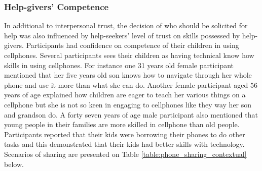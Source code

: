 \subsubsection*{Help-givers' Competence}
In additional to interpersonal trust, the decision of who should be solicited for help was also influenced by help-seekers' level of trust on skills possessed by help-givers. Participants had confidence on competence of their children in using cellphones. Several participants sees their children as having technical know how skills in using cellphones. For instance one 31 years old female participant mentioned that her five years old son knows how to navigate through her whole phone and use it more than what she can do. Another female participant aged 56 years of age explained how children are eager to teach her various things on a cellphone but she is not so keen in engaging to cellphones like they way her son and grandson do. A forty seven years of age male participant also mentioned that young people in their families are more skilled in cellphone than old people.
Participants reported that their kids were borrowing their phones to do other tasks and this demonstrated that their kids had better skills with technology. Scenarios of sharing are presented on Table \ref{table:phone_sharing_contextual} below. 

